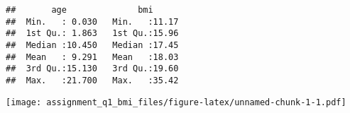 \begin{Shaded}
\begin{Highlighting}[]

\end{Highlighting}
\end{Shaded}

\begin{verbatim}
##       age              bmi       
##  Min.   : 0.030   Min.   :11.17  
##  1st Qu.: 1.863   1st Qu.:15.96  
##  Median :10.450   Median :17.45  
##  Mean   : 9.291   Mean   :18.03  
##  3rd Qu.:15.130   3rd Qu.:19.60  
##  Max.   :21.700   Max.   :35.42
\end{verbatim}

\begin{Shaded}
\begin{Highlighting}[]
\OtherTok{\textless{}{-}} 
\OtherTok{\textless{}{-}} \SpecialCharTok{\textgreater{}}\SpecialCharTok{\&}\SpecialCharTok{\textless{}}\SpecialCharTok{+} \NormalTok{))}
\OtherTok{\textless{}{-}}\SpecialCharTok{$}

\OtherTok{=} 
\OtherTok{=} \NormalTok{(}\SpecialCharTok{{-}} \SpecialCharTok{/}

\end{Highlighting}
\end{Shaded}

\texttt{[image: assignment\_q1\_bmi\_files/figure-latex/unnamed-chunk-1-1.pdf]}

\begin{Shaded}
\begin{Highlighting}[]
 \NormalTok{)}
\end{Highlighting}
\end{Shaded}

